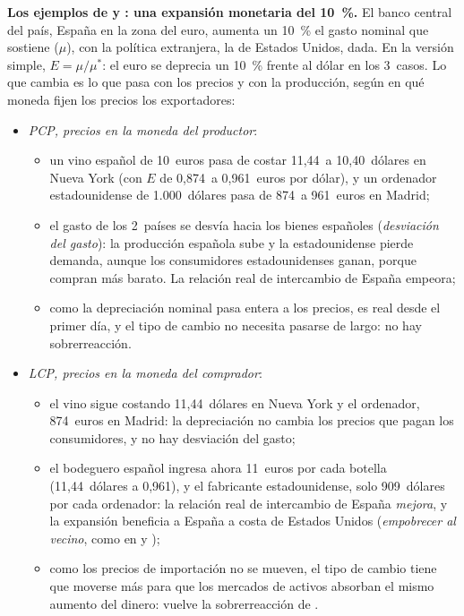 \documentclass[11pt]{article}
\begin{document}
\begin{anotaciones}[unbreakable]
\textbf{Los ejemplos de  y : una expansión monetaria del 10~\%.} El banco central del país, España en la zona del euro, aumenta un 10~\% el gasto nominal que sostiene ($\mu$), con la política extranjera, la de Estados Unidos, dada. En la versión simple, $E=\mu/\mu^*$: el euro se deprecia un 10~\% frente al dólar en los 3~casos. Lo que cambia es lo que pasa con los precios y con la producción, según en qué moneda fijen los precios los exportadores\nocite{CorsettiPesenti2009,BettsDevereux2000,Gopinath2020DCP}:
\begin{itemize}
\item \emph{PCP, precios en la moneda del productor}:
  \begin{itemize}
  \item un vino español de 10~euros pasa de costar 11,44~a 10,40~dólares en Nueva York (con $E$ de 0,874~a 0,961~euros por dólar), y un ordenador estadounidense de 1.000~dólares pasa de 874~a 961~euros en Madrid;
  \item el gasto de los 2~países se desvía hacia los bienes españoles (\emph{desviación del gasto}): la producción española sube y la estadounidense pierde demanda, aunque los consumidores estadounidenses ganan, porque compran más barato. La relación real de intercambio de España empeora;
  \item como la depreciación nominal pasa entera a los precios, es real desde el primer día, y el tipo de cambio no necesita pasarse de largo: no hay sobrerreacción.
  \end{itemize}
\item \emph{LCP, precios en la moneda del comprador}:
  \begin{itemize}
  \item el vino sigue costando 11,44~dólares en Nueva York y el ordenador, 874~euros en Madrid: la depreciación no cambia los precios que pagan los consumidores, y no hay desviación del gasto;
  \item el bodeguero español ingresa ahora 11~euros por cada botella (11,44~dólares a 0,961), y el fabricante estadounidense, solo 909~dólares por cada ordenador: la relación real de intercambio de España \emph{mejora}, y la expansión beneficia a España a costa de Estados Unidos (\emph{empobrecer al vecino}, como en  y );
  \item como los precios de importación no se mueven, el tipo de cambio tiene que moverse más para que los mercados de activos absorban el mismo aumento del dinero: vuelve la sobrerreacción de .

\end{itemize}
\end{itemize}
\end{anotaciones}
\end{document}
